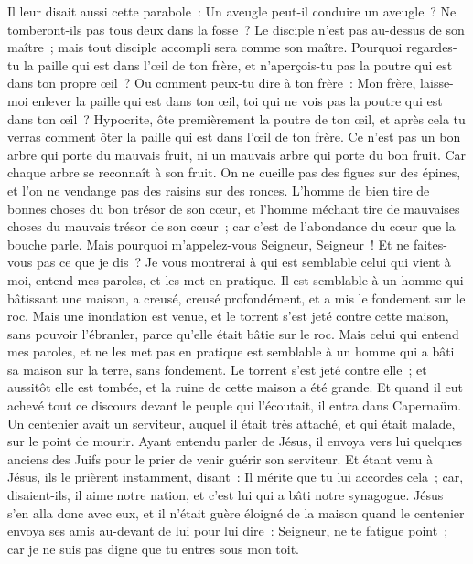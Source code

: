 \begin{multicols}{2}
Il leur disait aussi cette parabole~: Un aveugle peut-il conduire un aveugle~? Ne tomberont-ils pas tous deux dans la fosse~?
Le disciple n'est pas au-dessus de son maître~; mais tout disciple accompli sera comme son maître.
Pourquoi regardes-tu la paille qui est dans l'œil de ton frère, et n'aperçois-tu pas la poutre qui est dans ton propre œil~?
Ou comment peux-tu dire à ton frère~: Mon frère, laisse-moi enlever la paille qui est dans ton œil, toi qui ne vois pas la poutre qui est dans ton œil~? Hypocrite, ôte premièrement la poutre de ton œil, et après cela tu verras comment ôter la paille qui est dans l'œil de ton frère.
Ce n'est pas un bon arbre qui porte du mauvais fruit, ni un mauvais arbre qui porte du bon fruit.
Car chaque arbre se reconnaît à son fruit. On ne cueille pas des figues sur des épines, et l'on ne vendange pas des raisins sur des ronces.
L'homme de bien tire de bonnes choses du bon trésor de son cœur, et l'homme méchant tire de mauvaises choses du mauvais trésor de son cœur~; car c'est de l'abondance du cœur que la bouche parle.
Mais pourquoi m'appelez-vous Seigneur, Seigneur~! Et ne faites-vous pas ce que je dis~?
Je vous montrerai à qui est semblable celui qui vient à moi, entend mes paroles, et les met en pratique.
Il est semblable à un homme qui bâtissant une maison, a creusé, creusé profondément, et a mis le fondement sur le roc. Mais une inondation est venue, et le torrent s'est jeté contre cette maison, sans pouvoir l'ébranler, parce qu'elle était bâtie sur le roc.
Mais celui qui entend mes paroles, et ne les met pas en pratique est semblable à un homme qui a bâti sa maison sur la terre, sans fondement. Le torrent s'est jeté contre elle~; et aussitôt elle est tombée, et la ruine de cette maison a été grande.
\VerseOne{}Et quand il eut achevé tout ce discours devant le peuple qui l'écoutait, il entra dans Capernaüm.
Un centenier avait un serviteur, auquel il était très attaché, et qui était malade, sur le point de mourir.
Ayant entendu parler de Jésus, il envoya vers lui quelques anciens des Juifs pour le prier de venir guérir son serviteur.
Et étant venu à Jésus, ils le prièrent instamment, disant~: Il mérite que tu lui accordes cela~;
car, disaient-ils, il aime notre nation, et c'est lui qui a bâti notre synagogue.
Jésus s'en alla donc avec eux, et il n'était guère éloigné de la maison quand le centenier envoya ses amis au-devant de lui pour lui dire~: Seigneur, ne te fatigue point~; car je ne suis pas digne que tu entres sous mon toit.

\end{multicols}
